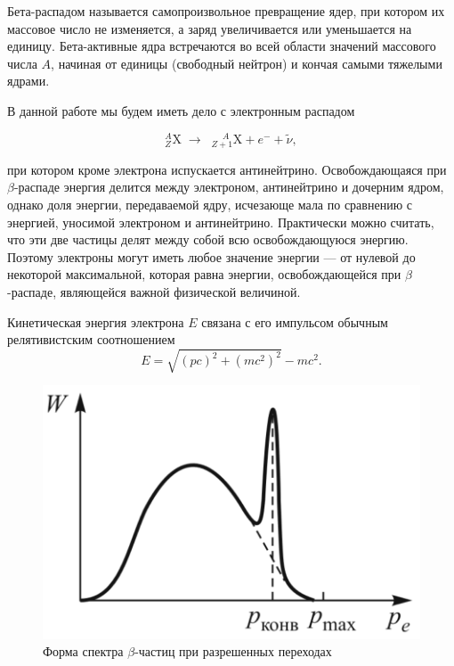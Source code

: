 \documentclass{article}
\begin{document}
	
	Бета-распадом называется самопроизвольное превращение ядер, при котором их массовое число не изменяется, а заряд увеличивается или уменьшается на единицу. Бета-активные ядра встречаются во всей области значений массового числа $A$, начиная от единицы (свободный нейтрон) и кончая самыми тяжелыми ядрами.	
	
	В данной работе мы будем иметь дело с электронным распадом
	
	\begin{equation*}
		_Z^A\text{X} \; \longrightarrow \;\; _{Z+1}^{\;\;\;\;\,A}\text{X} + e^- + \widetilde{\nu},
	\end{equation*}

	\noindent при котором кроме электрона испускается антинейтрино. Освобождающаяся при $\beta$-распаде энергия делится между электроном, антинейтрино и дочерним ядром, однако доля энергии, передаваемой ядру, исчезающе мала по сравнению с энергией, уносимой электроном и антинейтрино. Практически можно считать, что эти две частицы делят между собой всю освобождающуюся энергию. Поэтому электроны могут иметь любое значение энергии — от нулевой до некоторой максимальной, которая равна энергии, освобождающейся при $\beta$-распаде, являющейся важной физической величиной.
	
	Кинетическая энергия электрона $E$ связана с его импульсом обычным релятивистским соотношением
	\begin{equation}
		E = \sqrt{(pc)^2 + (mc^2)^2} - mc^2.
	\end{equation}

	\begin{figure}
		\centering
		\includegraphics[width=1.2 \linewidth]{pic1.PNG}
		\caption{Форма спектра $\beta$-частиц при разрешенных переходах}
		\label{BetaParticles_Spectre}
	\end{figure}
\end{document}
